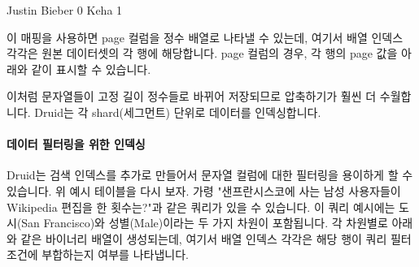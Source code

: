 \documentclass[letterpaper,10pt,english]{sphinxmanual}
\begin{document}
\begin{sphinxVerbatim}[commandchars=\\\{\}]
Justin Bieber \PYGZhy{}\PYGZgt{} 0
Ke\PYGZdl{}ha \PYGZhy{}\PYGZgt{} 1
\end{sphinxVerbatim}

이 매핑을 사용하면 page 컬럼을 정수 배열로 나타낼 수 있는데, 여기서 배열 인덱스 각각은 원본 데이터셋의 각 행에 해당합니다. page 컬럼의 경우, 각 행의 page 값을 아래와 같이 표시할 수 있습니다.

\begin{sphinxVerbatim}[commandchars=\\\{\}]
\PYG{p}{[}   \PYG{p}{]}
\end{sphinxVerbatim}

이처럼 문자열들이 고정 길이 정수들로 바뀌어 저장되므로 압축하기가 훨씬 더 수월합니다. Druid는 각 shard(세그먼트) 단위로 데이터를 인덱싱합니다.


\paragraph{데이터 필터링을 위한 인덱싱}
\label{\detokenize{discovery/part01/druid_features:id4}}
Druid는 검색 인덱스를 추가로 만들어서 문자열 컬럼에 대한 필터링을 용이하게 할 수 있습니다. 위 예시 테이블을 다시 보자. 가령 "샌프란시스코에 사는 남성 사용자들이 Wikipedia 편집을 한 횟수는?"과 같은 쿼리가 있을 수 있습니다. 이 쿼리 예시에는 도시(San Francisco)와 성별(Male)이라는 두 가지 차원이 포함됩니다. 각 차원별로 아래와 같은 바이너리 배열이 생성되는데, 여기서 배열 인덱스 각각은 해당 행이 쿼리 필터 조건에 부합하는지 여부를 나타냅니다.

\begin{sphinxVerbatim}[commandchars=\\\{\}]
     \PYG{p}{[}\PYG{p}{]}  \PYG{p}{[}\PYG{p}{]}\PYG{p}{[}\PYG{p}{]}\PYG{p}{[}\PYG{p}{]}\PYG{p}{[}\PYG{p}{]}
    \PYG{p}{[}   \PYG{p}{]}  \PYG{p}{[}\PYG{p}{]}\PYG{p}{[}\PYG{p}{]}\PYG{p}{[}\PYG{p}{]}\PYG{p}{[}\PYG{p}{]}
\end{sphinxVerbatim}
\end{document}
